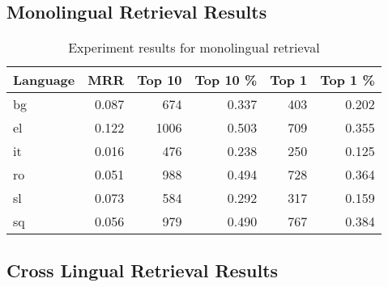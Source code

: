 \subsection{Monolingual Retrieval Results}%
\label{sub:chap4_results}

\begin{table}[htbp]
    \centering
    \begin{tabular}{lrrrrr}
        \toprule%
        Language & MRR & Top 10 & Top 10 \% & Top 1 & Top 1 \% \\
        \midrule%
        bg & 0.087 & 674 & 0.337 & 403 & 0.202 \\
        el & 0.122 & 1006 & 0.503 & 709 & 0.355 \\
        it & 0.016 & 476 & 0.238 & 250 & 0.125 \\
        ro & 0.051 & 988 & 0.494 & 728 & 0.364 \\
        sl & 0.073 & 584 & 0.292 & 317 & 0.159 \\
        sq & 0.056 & 979 & 0.490 & 767 & 0.384 \\
        \bottomrule
    \end{tabular}
    \caption{Experiment results for monolingual retrieval}%
    \label{tab:monolingual_tfidf}
\end{table}

\subsection{Cross Lingual Retrieval Results}%
\label{sub:cross_lingual_retrieval_results}

